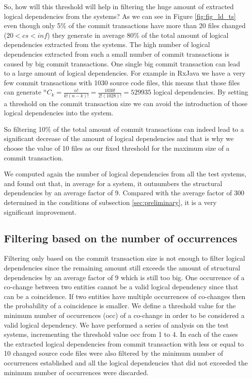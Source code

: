 \documentclass[conference]{IEEEtran}
\newcommand*{\Comb}[2]{{}^{#1}C_{#2}}%
\begin{document}
So, how will this threshold will help in filtering the huge amount of extracted logical dependencies from the systems?
As we can see in Figure \ref{fig:fig_ld_ts} even though only 5\% of the commit transactions have more than 20 files changed ($20<cs<inf$) they generate in average 80\% of the total amount of logical dependencies extracted from the systems.
The high number of logical dependencies extracted from such a small number of commit transactions is caused by big commit transactions. 
One single big commit transaction can lead to a large amount of logical dependencies. For example in RxJava we have a very few commit transactions with 1030 source code files, this means that those files can generate 
$\Comb{n}{k}=\frac{n!}{k!(n-k)!} = \frac{1030!}{2!(1028)!} = 529 935$ logical dependencies. By setting a threshold on the commit transaction size we can avoid the introduction of those logical dependencies into the system.

So filtering 10\% of the total amount of commit transactions can indeed lead to a significant decrease of the amount of logical dependencies and that is why we choose the value of 10 files as our fixed threshold for the maximum size of a commit transaction.

We computed again the number of logical dependencies from all the test systems, and found out that, in average for a system, it outnumbers the structural dependencies by an average factor of 9.  Compared with the average factor of 300 determined in the conditions of subsection \ref{sec:preliminary}, it is a very significant improvement.


\subsection{Filtering based on the number of occurrences}
\label{sec:filterocc}
Filtering only based on the commit transaction size is not enough to filter logical dependencies since the remaining amount still exceeds the amount of structural dependencies by an average factor of 9 which is still too big. 
One occurrence of a co-change between two entities cannot be a valid logical dependency since that can be a coincidence. If two entities have multiple occurrences of co-changes then the probability of a coincidence is smaller. We define a threshold value for the minimum number of occurrences (occ) of a co-change in order to be considered a valid logical dependency.
We have performed a series of analysis on the test systems, incrementing the threshold value occ from 1 to 4. In each of the cases the extracted logical dependencies from commit transaction with less or equal to 10 changed source code files were also filtered by the minimum number of occurrences established and all the logical dependencies that did not exceeded the minimum number of occurrences were discarded. 
\end{document}
